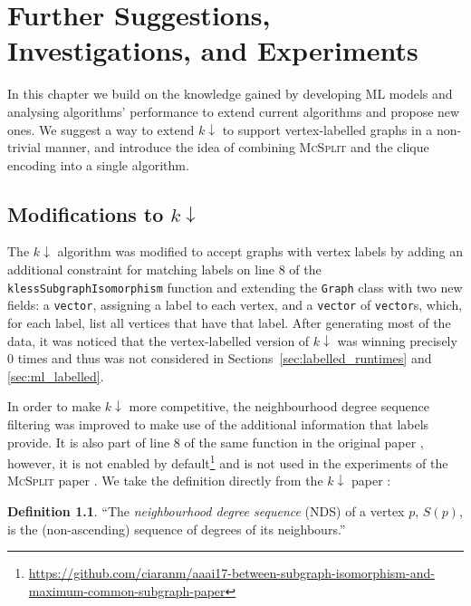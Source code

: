 \documentclass{l4proj}
\theoremstyle{definition}
\newtheorem{definition}{Definition}[chapter]
\theoremstyle{remark}
\begin{document}
\chapter{Further Suggestions, Investigations, and Experiments} \label{chapter:further}

In this chapter we build on the knowledge gained by developing ML models and
analysing algorithms' performance to extend current algorithms and propose new
ones. We suggest a way to extend $k{\downarrow}$ to support vertex-labelled
graphs in a non-trivial manner, and introduce the idea of combining
\textsc{McSplit} and the clique encoding into a single algorithm.

\section{Modifications to \texorpdfstring{$k{\downarrow}$}{kdown}}

The $k{\downarrow}$ algorithm was modified to accept graphs with vertex
labels by adding an additional constraint for matching labels on line 8 of the
\texttt{klessSubgraphIsomorphism} function \cite{DBLP:conf/aaai/HoffmannMR17}
and extending the \texttt{Graph} class with two new fields: a \texttt{vector},
assigning a label to each vertex, and a \texttt{vector} of \texttt{vector}s,
which, for each label, list all vertices that have that label. After generating
most of the data, it was noticed that the vertex-labelled version of
$k{\downarrow}$ was winning precisely 0 times and thus was not considered in
Sections~\ref{sec:labelled_runtimes} and \ref{sec:ml_labelled}.

In order to make $k{\downarrow}$ more competitive, the neighbourhood degree
sequence filtering was improved to make use of the additional information that
labels provide. It is also part of line 8 of the same function in the original
paper \cite{DBLP:conf/aaai/HoffmannMR17}, however, it is not enabled by
default\footnote{\url{https://github.com/ciaranm/aaai17-between-subgraph-isomorphism-and-maximum-common-subgraph-paper}}
and is not used in the experiments of the \textsc{McSplit} paper
\cite{DBLP:conf/ijcai/McCreeshPT17}. We take the definition directly from the
$k{\downarrow}$ paper \cite{DBLP:conf/aaai/HoffmannMR17}:

\begin{definition}
  ``The \emph{neighbourhood degree sequence} (NDS) of a vertex $p$, $S(p)$, is the
  (non-ascending) sequence of degrees of its neighbours.''
\end{definition}
\end{document}
